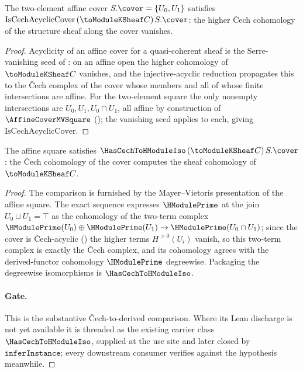 \begin{proposition}
  \label{thm:adelic_instIsCechAcyclicCover}
  The two-element affine cover \(S.\cover = \{U_0, U_1\}\) satisfies
  \(\mathrm{IsCechAcyclicCover}\, (\toModuleKSheaf C)\, S.\cover\): the
  higher Čech cohomology of the structure sheaf along the cover
  vanishes.
\end{proposition}
\begin{proof}
  Acyclicity of an affine cover for a quasi-coherent sheaf is the
  Serre-vanishing seed of : on an affine
  open the higher cohomology of \(\toModuleKSheaf C\) vanishes, and the
  injective-acyclic reduction 
  propagates this to the Čech complex of the cover whose members and all
  of whose finite intersections are affine. For the two-element square
  the only nonempty intersections are \(U_0, U_1, U_0 \cap U_1\), all
  affine by construction of \(\AffineCoverMVSquare\)
  (); the vanishing seed applies to
  each, giving \(\mathrm{IsCechAcyclicCover}\).
\end{proof}

\begin{proposition}
  \label{thm:adelic_instHasCechToHModuleIso}
  The affine square satisfies
  \(\HasCechToHModuleIso\, (\toModuleKSheaf C)\, S.\cover\): the Čech
  cohomology of the cover computes the sheaf cohomology of
  \(\toModuleKSheaf C\).
\end{proposition}
\begin{proof}
  The comparison is furnished by the Mayer--Vietoris presentation of the
  affine square. The exact sequence
  expresses \(\HModulePrime\) at the join \(U_0 \sqcup U_1 = \top\) as the
  cohomology of the two-term complex
  \(\HModulePrime(U_0) \oplus \HModulePrime(U_1) \to
  \HModulePrime(U_0 \cap U_1)\); since the cover is Čech-acyclic
  () the higher terms
  \(H^{>0}(U_i)\) vanish, so this two-term complex is exactly the Čech
  complex, and its cohomology agrees with the derived-functor cohomology
  \(\HModulePrime\) degreewise. Packaging the degreewise isomorphisms is
  \(\HasCechToHModuleIso\).
  \paragraph{Gate.} This is the substantive Čech-to-derived comparison.
  Where its Lean discharge is not yet available it is threaded as the
  existing carrier class \(\HasCechToHModuleIso\), supplied at the use
  site and later closed by \(\texttt{inferInstance}\); every downstream consumer
  verifies against the hypothesis meanwhile.
\end{proof}


